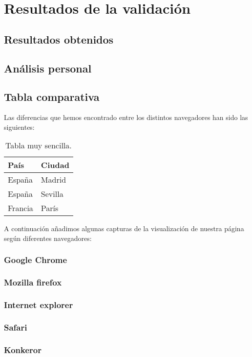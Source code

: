 \section{Resultados de la validación}
\subsection{Resultados obtenidos}
\subsection{Análisis personal}
\subsection{Tabla comparativa}
Las diferencias que hemos encontrado entre los distintos navegadores han sido las siguientes:\\
\begin{table}[htbp]
	\begin{center}
		\begin{tabular}{|l|l|}
			\hline
			País & Ciudad \\
			\hline \hline
			España & Madrid \\ \hline
			España & Sevilla \\ \hline
			Francia & París \\ \hline
		\end{tabular}
		\caption{Tabla muy sencilla.}
		\label{tabla:sencilla}
	\end{center}
\end{table}
A continuación añadimos algunas capturas de la visualización de nuestra página según diferentes navegadores:
\subsubsection{Google Chrome}
\subsubsection{Mozilla firefox}
\subsubsection{Internet explorer}
\subsubsection{Safari}
\subsubsection{Konkeror}
